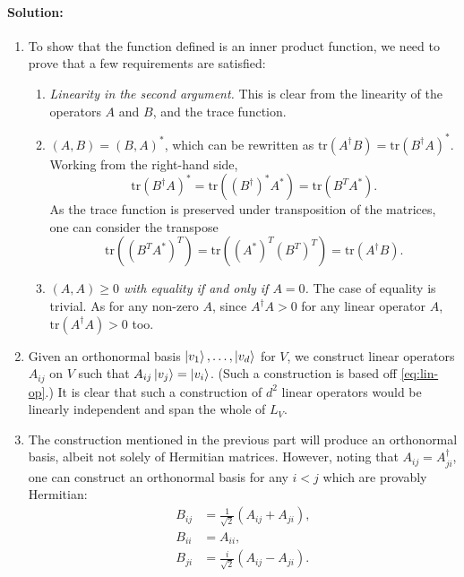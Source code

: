 \paragraph{Solution:} \begin{enumerate}
  \item To show that the function defined is an inner product function, we need
    to prove that a few requirements are satisfied: \begin{enumerate}
      \item \emph{Linearity in the second argument.} This is clear from the
        linearity of the operators $A$ and $B$, and the trace function.
      \item \emph{$(A, B) = (B, A)^*$}, which can be rewritten as $\mathrm{tr}
        (A^\dagger B) = \mathrm{tr}(B^\dagger A)^*$. Working from the
        right-hand side, \begin{equation*}
          \mathrm{tr}(B^\dagger A)^* = \mathrm{tr}((B^\dagger)^* A^*) =
          \mathrm{tr}(B^T A^*).
        \end{equation*}
        As the trace function is preserved under transposition of the matrices,
        one can consider the transpose \begin{equation*}
          \mathrm{tr}((B^T A^*)^T) = \mathrm{tr}((A^*)^T (B^T)^T) = \mathrm{tr}
          (A^\dagger B).
        \end{equation*}
      \item \emph{$(A, A) \geq 0$ with equality if and only if $A = 0$.} The
        case of equality is trivial. As for any non-zero $A$, since $A^\dagger
        A > 0$ for any linear operator $A$, $\mathrm{tr}(A^\dagger A) > 0$ too.
    \end{enumerate}
  \item Given an orthonormal basis $\ket{v_1}, \ldots, \ket{v_d}$ for $V$, we
    construct linear operators $A_{ij}$ on $V$ such that $A_{ij}\ket{v_j} =
    \ket{v_i}$. (Such a construction is based off \eqref{eq:lin-op}.) It is
    clear that such a construction of $d^2$ linear operators would be linearly
    independent and span the whole of $L_V$.
  \item The construction mentioned in the previous part will produce an
    orthonormal basis, albeit not solely of Hermitian matrices. However, noting
    that $A_{ij} = A_{ji}^\dagger$, one can construct an orthonormal basis for
    any $i < j$ which are provably Hermitian:
    \begin{align*}
      B_{ij} &= \frac{1}{\sqrt{2}}(A_{ij} + A_{ji}), \\
      B_{ii} &= A_{ii}, \\
      B_{ji} &= \frac{i}{\sqrt{2}}(A_{ij} - A_{ji}). \\
    \end{align*}
\end{enumerate}

